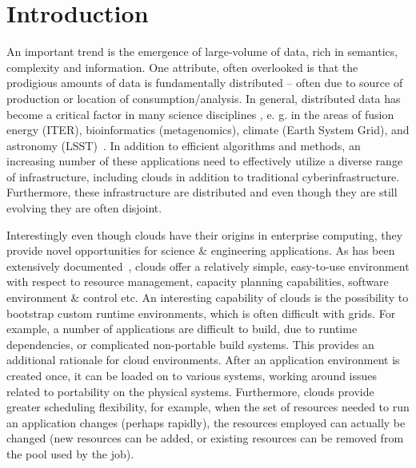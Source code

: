 \documentclass[times]{cpeauth}
\begin{document}

\maketitle


\vspace{-6pt}

\section{Introduction}
\vspace{-2pt}


An important trend is the emergence of large-volume of data, rich in
semantics, complexity and information. One attribute, often overlooked
is that the prodigious amounts of data is fundamentally distributed --
often due to source of production or location of
consumption/analysis. In general, distributed data has become a
critical factor in many science disciplines \cite{fourthparadigm},
e. g. in the areas of fusion energy (ITER), bioinformatics
(metagenomics), climate (Earth System Grid), and astronomy
(LSST)~\cite{Jha:2011fk}. In addition to efficient algorithms and
methods, an increasing number of these applications need to
effectively utilize a diverse range of infrastructure, including
clouds in addition to traditional cyberinfrastructure.  Furthermore,
these infrastructure are distributed and even though they are still
evolving they are often disjoint.


Interestingly even though clouds have their origins in enterprise
computing, they provide novel opportunities for science \& engineering
applications.  As has been extensively documented~\cite{Jha:2010kx},
clouds offer a relatively simple, easy-to-use environment with respect
to resource management, capacity planning capabilities, software
environment \& control etc.  An interesting capability of clouds is
the possibility to bootstrap custom runtime environments, which is
often difficult with grids. For example, a number of applications are
difficult to build, due to runtime dependencies, or complicated
non-portable build systems. This provides an additional rationale for
cloud environments. After an application environment is created once,
it can be loaded on to various systems, working around issues related
to portability on the physical systems. Furthermore, clouds provide
greater scheduling flexibility, for example, when the set of resources
needed to run an application changes (perhaps rapidly), the resources
employed can actually be changed (new resources can be added, or
existing resources can be removed from the pool used by the job).
\end{document}
